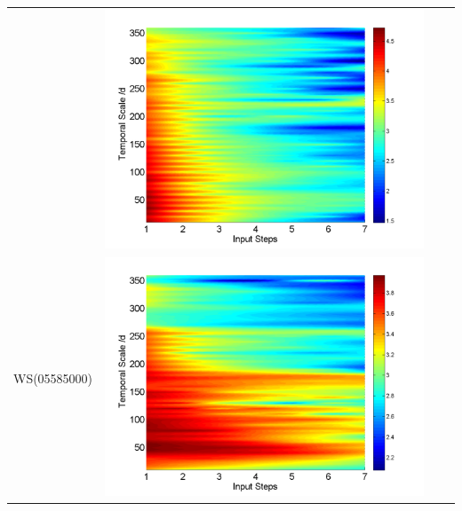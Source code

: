 \documentclass[draft,wrr]{AGUTeX}
\begin{document}
\begin{article}
\begin{table}[H]
\begin{tabular}{cccc}
&\begin{minipage}{.3\textwidth}\includegraphics[width=\linewidth]{resultgraph/02143000pepq_rela.png}\end{minipage}
\\
WS(05585000)
&\begin{minipage}{.3\textwidth}\includegraphics[width=\linewidth]{resultgraph/05585000p_rela.png}\end{minipage}

\end{tabular}
\end{table}
\end{article}
\end{document}
